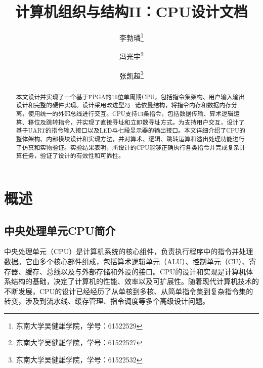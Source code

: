 \documentclass[lang=cn,a4paper,newtx]{elegantpaper}
\title{计算机组织与结构II：CPU设计文档}
\author{
  李勃璘\thanks{东南大学吴健雄学院，学号：61522529} \and
  冯光宇\thanks{东南大学吴健雄学院，学号：61522527} \and
  张凯超\thanks{东南大学吴健雄学院，学号：61522532}
}
\date{\zhdate{2025/5/8}}
\begin{document}
\maketitle
\thispagestyle{empty}
\begin{abstract}
  本文设计并实现了一个基于FPGA的16位单周期CPU，包括指令集架构、用户输入输出设计和完整的硬件实现。设计采用改进型冯·诺依曼结构，将指令内存和数据内存分离，使用统一的外部总线进行交互。CPU支持13条指令，包括数据传输、算术逻辑运算、移位及跳转指令，并实现了直接寻址和立即数寻址方式。为支持用户交互，设计了基于UART的指令输入接口以及LED与七段显示器的输出接口。本文详细介绍了CPU的整体架构、内部模块设计和实现方法，并对算术、逻辑、跳转运算和溢出处理功能进行了仿真和实物验证。实验结果表明，所设计的CPU能够正确执行各类指令并完成复杂计算任务，验证了设计的有效性和可靠性。
\end{abstract}








\newpage
{}
\tableofcontents
\newpage
\listoffigures
\newpage
\listoftables
\newpage
{}
\lstset{nolol}
\section{概述}
\subsection{中央处理单元CPU简介}
中央处理单元（CPU）是计算机系统的核心组件，负责执行程序中的指令并处理数据。它由多个核心部件组成，包括算术逻辑单元（ALU）、控制单元（CU）、寄存器、缓存、总线以及与外部存储和外设的接口。CPU的设计和实现是计算机体系结构的基础，决定了计算机的性能、效率以及可扩展性。随着现代计算机技术的不断发展，CPU的设计已经经历了从单核到多核、从简单指令集到复杂指令集的转变，涉及到流水线、缓存管理、指令调度等多个高级设计问题。
\end{document}

